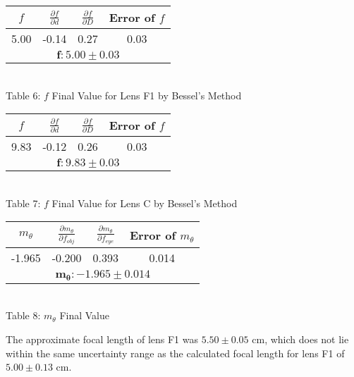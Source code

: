 \begin{center}
    
    \centering
    \begin{tabular}{|c|c|c|c|}
    \hline
        $f$ & $\frac{\partial f}{\partial d}$ & $\frac{\partial f}{\partial D}$ & Error of $f$  \\ \hline
        5.00 & -0.14 & 0.27 & 0.03 \\ \hline
        \multicolumn{4}{|c|}{$\bm{f: 5.00\pm0.03}$}\\\hline
    \end{tabular} 
    \vspace{3mm}
    \\ Table 6: $f$ Final Value for Lens F1 by Bessel's Method\\
    \vspace{6mm} 
    \centering
    \begin{tabular}{|c|c|c|c|}
    \hline
        $f$ & $\frac{\partial f}{\partial d}$ & $\frac{\partial f}{\partial D}$ & Error of $f$  \\ \hline
        9.83 & -0.12 & 0.26 & 0.03 \\ \hline
        \multicolumn{4}{|c|}{$\bm{f: 9.83\pm0.03}$}\\\hline
    \end{tabular} 
    \vspace{3mm}
    \\ Table 7: $f$ Final Value for Lens C by Bessel's Method\\
    \vspace{6mm}
    \centering
    \begin{tabular}{|c|c|c|c|}
    \hline
        $m_\theta$ & $\frac{\partial m_\theta}{\partial f_{obj}}$ & $\frac{\partial m_\theta}{\partial f_{eye}}$ & Error of $m_\theta$  \\ \hline
        -1.965 & -0.200 & 0.393 & 0.014 \\ \hline
        \multicolumn{4}{|c|}{$\bm{m_\theta: -1.965\pm0.014}$}\\\hline
    \end{tabular} 
    \vspace{3mm}
    \\ Table 8: $m_\theta$ Final Value \\
    \vspace{6mm}
\end{center}
\indent \indent The approximate focal length of lens F1 was $5.50\pm0.05$ cm, which does not lie within the same uncertainty range as the calculated focal length for lens F1 of $5.00\pm0.13$ cm. 
